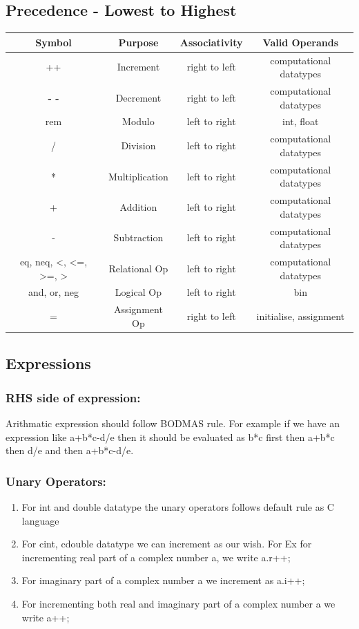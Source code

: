 \documentclass[12pt]{article}
\begin{document}
\subsection{Precedence - Lowest to Highest}
\begin{table}[ht]
\centering
\renewcommand{\arraystretch}{1.5} %
\setlength{\tabcolsep}{15pt} %
\begin{tabular}{|c|c|c|c|}
\hline
\textbf{Symbol} & \textbf{Purpose} & \textbf{Associativity} & \textbf{Valid Operands} \\
\hline
++ & Increment & right to left & computational datatypes \\
\hline
\textbf{- -} & Decrement & right to left & computational datatypes \\
\hline
rem & Modulo & left to right & int, float  \\
\hline
/ & Division  & left to right & computational datatypes \\
\hline
* &  Multiplication & left to right & computational datatypes \\
\hline
+ &  Addition & left to right & computational datatypes  \\
\hline
- &  Subtraction & left to right & computational datatypes \\
\hline
eq, neq, <, <=, >=, > & Relational Op & left to right & computational datatypes \\
\hline
and, or, neg & Logical Op & left to right & bin \\
\hline
= & Assignment Op & right to left & initialise, assignment \\
\hline
\end{tabular}
\end{table}

\subsection{Expressions}
    \subsubsection{ RHS side of expression:}
    Arithmatic expression should follow BODMAS rule.
    For example if we have an expression like a+b*c-d/e then it should be evaluated as b*c first then a+b*c then d/e and then a+b*c-d/e.
    \subsubsection{ Unary Operators:}
    \begin{enumerate}
        \item For int and double datatype the unary operators follows default rule as C language
        \item For cint, cdouble datatype we can increment as our wish. For Ex for incrementing real part of a complex number a, we write a.r++; 
        \item For imaginary part of a complex number a we increment as a.i++;
        \item For incrementing both real and imaginary part of a complex number a we write a++;
    \end{enumerate}
\end{document}
